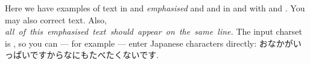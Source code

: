 Here we have examples of text in  and \emph{emphasised} and  and in  and with  and . You may also correct  text.  Also, \mbox{\emph{all of this emphasised text should appear on the same line.}} The input charset is , so you can --- for example --- enter Japanese characters directly: おなかがいっぱいですからなにもたべたくないです.

